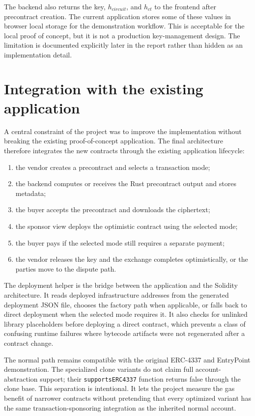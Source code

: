 The backend also returns the key, \(h_{\mathit{circuit}}\), and \(h_{\mathit{ct}}\) to the
frontend after precontract creation. The current application stores some of these values in
browser local storage for the demonstration workflow. This is acceptable for the local proof
of concept, but it is not a production key-management design. The limitation is documented
explicitly later in the report rather than hidden as an implementation detail.

\section{Integration with the existing application}

A central constraint of the project was to improve the implementation without breaking the
existing proof-of-concept application. The final architecture therefore integrates the new
contracts through the existing application lifecycle:

\begin{enumerate}
  \item the vendor creates a precontract and selects a transaction mode;
  \item the backend computes or receives the Rust precontract output and stores metadata;
  \item the buyer accepts the precontract and downloads the ciphertext;
  \item the sponsor view deploys the optimistic contract using the selected mode;
  \item the buyer pays if the selected mode still requires a separate payment;
  \item the vendor releases the key and the exchange completes optimistically, or the parties
  move to the dispute path.
\end{enumerate}

The deployment helper is the bridge between the application and the Solidity architecture.
It reads deployed infrastructure addresses from the generated deployment JSON file, chooses
the factory path when applicable, or falls back to direct deployment when the selected mode
requires it. It also checks for unlinked library placeholders before deploying a direct
contract, which prevents a class of confusing runtime failures where bytecode artifacts were
not regenerated after a contract change.

The normal path remains compatible with the original ERC-4337 and EntryPoint demonstration. The
specialized clone variants do not claim full account-abstraction support; their
\texttt{supportsERC4337} function returns false through the clone base. This separation is
intentional. It lets the project measure the gas benefit of narrower contracts without
pretending that every optimized variant has the same transaction-sponsoring integration as
the inherited normal account.

